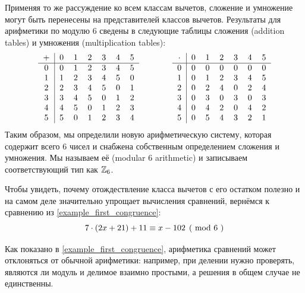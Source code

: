 \begin{example} 
Применяя то же рассуждение ко всем классам вычетов, сложение и умножение могут быть перенесены на представителей классов вычетов. Результаты для арифметики по модулю $6$ сведены в следующие таблицы сложения (addition tables) и умножения (multiplication tables):
\begin{equation}\label{eq:Z6_tables}
  \begin{tabular}{c | c c c c c c}
    + & 0 & 1 & 2 & 3 & 4 & 5\\\hline
    0 & 0 & 1 & 2 & 3 & 4 & 5 \\
    1 & 1 & 2 & 3 & 4 & 5 & 0\\
    2 & 2 & 3 & 4 & 5 & 0 & 1\\
    3 & 3 & 4 & 5 & 0 & 1 & 2\\
    4 & 4 & 5 & 0 & 1 & 2 & 3\\
    5 & 5 & 0 & 1 & 2 & 3 & 4
  \end{tabular} \quad \quad \quad \quad
  \begin{tabular}{c | c c c c c c}
$ \cdot $ & 0 & 1 & 2 & 3 & 4 & 5 \\\hline
        0 & 0 & 0 & 0 & 0 & 0 & 0\\
        1 & 0 & 1 & 2 & 3 & 4 & 5\\
        2 & 0 & 2 & 4 & 0 & 2 & 4\\
        3 & 0 & 3 & 0 & 3 & 0 & 3\\
        4 & 0 & 4 & 2 & 0 & 4 & 2\\
        5 & 0 & 5 & 4 & 3 & 2 & 1
  \end{tabular}
\end{equation}
Таким образом, мы определили новую арифметическую систему, которая содержит всего $6$ чисел и снабжена собственным определением сложения и умножения. Мы называем её  (modular 6 arithmetic) и записываем соответствующий тип как $\mathbb{Z}_6$.

Чтобы увидеть, почему отождествление класса вычетов с его остатком полезно и на самом деле значительно упрощает вычисления сравнений, вернёмся к сравнению из \examplename{} \ref{example_first_congruence}:
\begin{equation}
\label{example_congruence_two_1}
\kongru{7\cdot(2x+21) + 11}{x-102}{6}
\end{equation}

Как показано в \examplename{} \ref{example_first_congruence}, арифметика сравнений может отклоняться от обычной арифметики: например, при делении нужно проверять, являются ли модуль и делимое взаимно простыми, а решения в общем случае не единственны.


\end{example}
